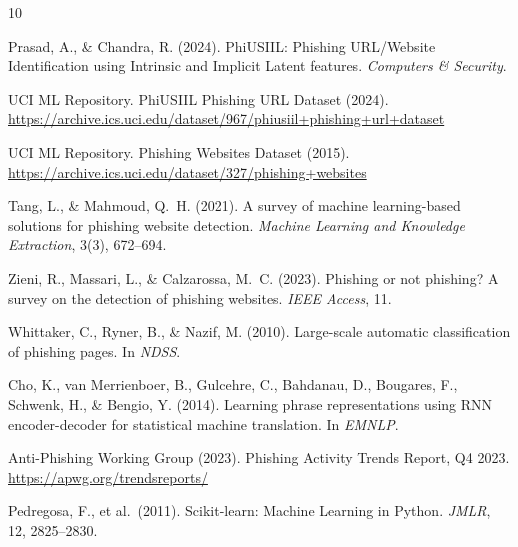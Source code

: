 \documentclass{article}
\begin{document}
\newpage
\begin{thebibliography}{10}
\small

Prasad, A., \& Chandra, R. (2024).
PhiUSIIL: Phishing URL/Website Identification using Intrinsic and Implicit Latent features.
\textit{Computers \& Security}.

UCI ML Repository. PhiUSIIL Phishing URL Dataset (2024).
\url{https://archive.ics.uci.edu/dataset/967/phiusiil+phishing+url+dataset}

UCI ML Repository. Phishing Websites Dataset (2015).
\url{https://archive.ics.uci.edu/dataset/327/phishing+websites}

Tang, L., \& Mahmoud, Q.~H. (2021).
A survey of machine learning-based solutions for phishing website detection.
\textit{Machine Learning and Knowledge Extraction}, 3(3), 672--694.

Zieni, R., Massari, L., \& Calzarossa, M.~C. (2023).
Phishing or not phishing? A survey on the detection of phishing websites.
\textit{IEEE Access}, 11.

Whittaker, C., Ryner, B., \& Nazif, M. (2010).
Large-scale automatic classification of phishing pages.
In \textit{NDSS}.

Cho, K., van Merrienboer, B., Gulcehre, C., Bahdanau, D., Bougares, F., Schwenk, H., \& Bengio, Y. (2014).
Learning phrase representations using RNN encoder-decoder for statistical machine translation.
In \textit{EMNLP}.

Anti-Phishing Working Group (2023).
Phishing Activity Trends Report, Q4 2023.
\url{https://apwg.org/trendsreports/}

Pedregosa, F., et al.\ (2011).
Scikit-learn: Machine Learning in Python.
\textit{JMLR}, 12, 2825--2830.

\end{thebibliography}
\end{document}
